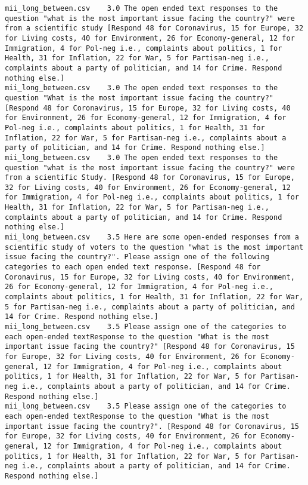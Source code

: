 \begin{lstlisting}[label=lst:promptvariants]
mii_long_between.csv	3.0	The open ended text responses to the question "what is the most important issue facing the country?" were from a scientific study [Respond 48 for Coronavirus, 15 for Europe, 32 for Living costs, 40 for Environment, 26 for Economy-general, 12 for Immigration, 4 for Pol-neg i.e., complaints about politics, 1 for Health, 31 for Inflation, 22 for War, 5 for Partisan-neg i.e., complaints about a party of politician, and 14 for Crime. Respond nothing else.]
mii_long_between.csv	3.0	The open ended text responses to the question "What is the most important issue facing the country?" [Respond 48 for Coronavirus, 15 for Europe, 32 for Living costs, 40 for Environment, 26 for Economy-general, 12 for Immigration, 4 for Pol-neg i.e., complaints about politics, 1 for Health, 31 for Inflation, 22 for War, 5 for Partisan-neg i.e., complaints about a party of politician, and 14 for Crime. Respond nothing else.]
mii_long_between.csv	3.0	The open ended text responses to the question "what is the most important issue facing the country?" were from a scientific Study. [Respond 48 for Coronavirus, 15 for Europe, 32 for Living costs, 40 for Environment, 26 for Economy-general, 12 for Immigration, 4 for Pol-neg i.e., complaints about politics, 1 for Health, 31 for Inflation, 22 for War, 5 for Partisan-neg i.e., complaints about a party of politician, and 14 for Crime. Respond nothing else.]
mii_long_between.csv	3.5	Here are some open-ended responses from a scientific study of voters to the question "what is the most important issue facing the country?". Please assign one of the following categories to each open ended text response. [Respond 48 for Coronavirus, 15 for Europe, 32 for Living costs, 40 for Environment, 26 for Economy-general, 12 for Immigration, 4 for Pol-neg i.e., complaints about politics, 1 for Health, 31 for Inflation, 22 for War, 5 for Partisan-neg i.e., complaints about a party of politician, and 14 for Crime. Respond nothing else.]
mii_long_between.csv	3.5	Please assign one of the categories to each open-ended textResponse to the question "What is the most important issue facing the country?" [Respond 48 for Coronavirus, 15 for Europe, 32 for Living costs, 40 for Environment, 26 for Economy-general, 12 for Immigration, 4 for Pol-neg i.e., complaints about politics, 1 for Health, 31 for Inflation, 22 for War, 5 for Partisan-neg i.e., complaints about a party of politician, and 14 for Crime. Respond nothing else.]
mii_long_between.csv	3.5	Please assign one of the categories to each open-ended textResponse to the question "What is the most important issue facing the country?". [Respond 48 for Coronavirus, 15 for Europe, 32 for Living costs, 40 for Environment, 26 for Economy-general, 12 for Immigration, 4 for Pol-neg i.e., complaints about politics, 1 for Health, 31 for Inflation, 22 for War, 5 for Partisan-neg i.e., complaints about a party of politician, and 14 for Crime. Respond nothing else.]

\end{lstlisting}
